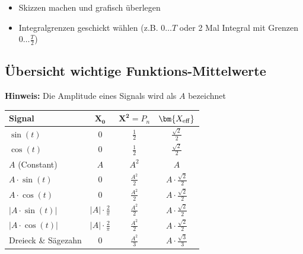 \begin{itemize}
	\item Skizzen machen und grafisch überlegen
	\item Integralgrenzen geschickt wählen (z.B. $0 \ldots T$ oder 2 Mal Integral mit Grenzen $0 \ldots \frac{T}{2}$)
\end{itemize}


\subsection{Übersicht wichtige Funktions-Mittelwerte}

\textbf{Hinweis:} Die Amplitude eines Signals wird als $A$ bezeichnet 

\begin{center}
    \renewcommand{\arraystretch}{1.6}
    \begin{tabular}{| l | c | c | c |}
        \hline
        \textbf{Signal}         & $\bm{X_0}$                    & $\bm{X^2} = P_n$        & $\bm{X_{\rm eff}}$                \\
        \hline
        $\sin(t)$               & $0$                           & $\frac{1}{2}$     & $\frac{\sqrt{2}}{2}$              \\
        \hline
        $\cos(t)$               & $0$                           & $\frac{1}{2}$     & $\frac{\sqrt{2}}{2}$              \\
        \hline
        $A$ (Constant)          & $A$                           & $A^2$             & $A$\\
        \hline
        $A \cdot \sin(t)$       & $0$                           & $\frac{A^2}{2}$   & $A \cdot \frac{\sqrt{2}}{2}$      \\
        \hline
        $A \cdot \cos(t)$       & $0$                           & $\frac{A^2}{2}$   & $A \cdot \frac{\sqrt{2}}{2}$      \\
        \hline
        $| A \cdot \sin(t) |$   & $| A | \cdot \frac{2}{\pi}$   & $\frac{A^2}{2}$   & $A \cdot \frac{\sqrt{2}}{2}$      \\
        \hline
        $| A \cdot \cos(t) |$   & $ | A | \cdot \frac{2}{\pi}$  & $\frac{A^2}{2}$   & $A \cdot \frac{\sqrt{2}}{2}$      \\
        \hline
        Dreieck \& Sägezahn     & $0$                           & $\frac{A^2}{3}$   &  $ A \cdot \frac{\sqrt{3}}{3}$    \\ 
        \hline
    \end{tabular}
    \renewcommand{\arraystretch}{1}
\end{center}

